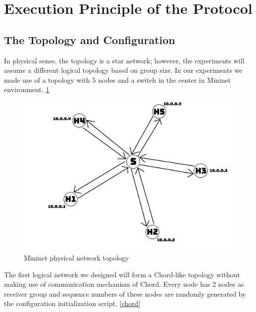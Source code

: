 \documentclass[a4paper, 12pt]{article}
\begin{document}
\section{Execution Principle of the Protocol}

\subsection{The Topology and Configuration}
In physical sense, the topology is a star network; however, the experiments will assume a different logical topology based on group size. In our experiments we made use of a topology with 5 nodes and a switch in the center in Mininet environment. \ref{mininet}

\begin{figure}[h]
\centering
   \includegraphics[scale=0.45]{mininet_topology.png}
   \caption{Mininet physical network topology}
   \label{mininet}
\end{figure}

The first logical network we designed will form a Chord-like topology without making use of communication mechanism of Chord. Every node has 2 nodes as receiver group and sequence numbers of these nodes are randomly generated by the configuration initialization script. \ref{chord}
\end{document}
